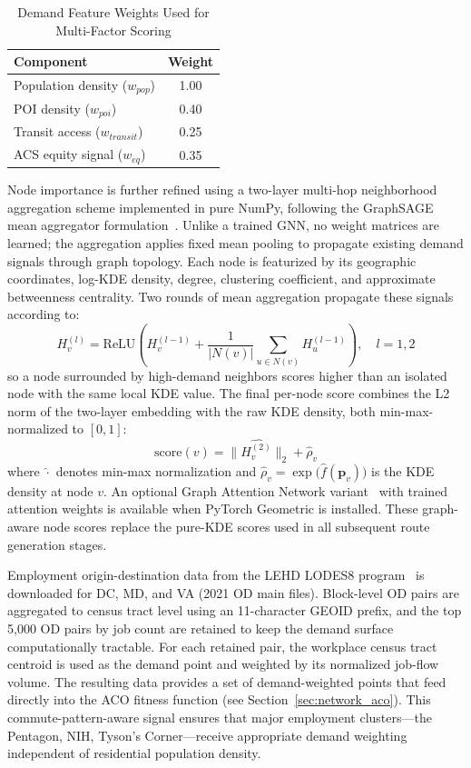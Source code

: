 \documentclass[sigconf,nonacm]{acmart}
\begin{document}
\begin{table}[h]
\caption{Demand Feature Weights Used for Multi-Factor Scoring}
\label{tab:demandweights}
\begin{tabular}{lc}
\toprule
\textbf{Component} & \textbf{Weight} \\
\midrule
Population density ($w_{pop}$) & 1.00 \\
POI density ($w_{poi}$) & 0.40 \\
Transit access ($w_{transit}$) & 0.25 \\
ACS equity signal ($w_{eq}$) & 0.35 \\
\bottomrule
\end{tabular}
\end{table}

Node importance is further refined using a two-layer multi-hop neighborhood aggregation scheme implemented in pure NumPy, following the GraphSAGE mean aggregator formulation~\cite{hamilton2017graphsage}. Unlike a trained GNN, no weight matrices are learned; the aggregation applies fixed mean pooling to propagate existing demand signals through graph topology. Each node is featurized by its geographic coordinates, log-KDE density, degree, clustering coefficient, and approximate betweenness centrality. Two rounds of mean aggregation propagate these signals according to:
\[
  H_v^{(l)} = \mathrm{ReLU}\!\left(H_v^{(l-1)} + \frac{1}{|N(v)|}\sum_{u \in N(v)} H_u^{(l-1)}\right), \quad l = 1, 2
\]
so a node surrounded by high-demand neighbors scores higher than an isolated node with the same local KDE value. The final per-node score combines the L2 norm of the two-layer embedding with the raw KDE density, both min-max-normalized to $[0, 1]$:
\[
  \mathrm{score}(v) = \widehat{\bigl\|H_v^{(2)}\bigr\|_2} + \hat{\rho}_v
\]
where $\widehat{\cdot}$ denotes min-max normalization and $\hat{\rho}_v = \exp\!\bigl(\hat{f}(\mathbf{p}_v)\bigr)$ is the KDE density at node $v$. An optional Graph Attention Network variant~\cite{velickovic2018gat} with trained attention weights is available when PyTorch Geometric is installed. These graph-aware node scores replace the pure-KDE scores used in all subsequent route generation stages.

Employment origin-destination data from the LEHD LODES8 program~\cite{lodes2023} is downloaded for DC, MD, and VA (2021 OD main files). Block-level OD pairs are aggregated to census tract level using an 11-character GEOID prefix, and the top 5,000 OD pairs by job count are retained to keep the demand surface computationally tractable. For each retained pair, the workplace census tract centroid is used as the demand point and weighted by its normalized job-flow volume. The resulting data provides a set of demand-weighted points that feed directly into the ACO fitness function (see Section~\ref{sec:network_aco}). This commute-pattern-aware signal ensures that major employment clusters---the Pentagon, NIH, Tyson's Corner---receive appropriate demand weighting independent of residential population density.
\end{document}
